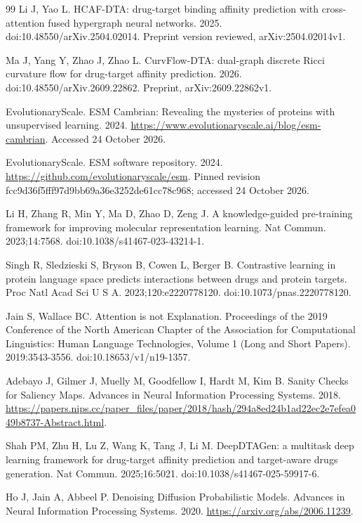 \documentclass[12pt,a4paper]{article}
\begin{document}
\begin{thebibliography}{99}
 Li J, Yao L. HCAF-DTA: drug-target binding affinity prediction with cross-attention fused hypergraph neural networks. 2025. doi:10.48550/arXiv.2504.02014. Preprint version reviewed, arXiv:2504.02014v1.

 Ma J, Yang Y, Zhao J, Zhao L. CurvFlow-DTA: dual-graph discrete Ricci curvature flow for drug-target affinity prediction. 2026. doi:10.48550/arXiv.2609.22862. Preprint, arXiv:2609.22862v1.

 EvolutionaryScale. ESM Cambrian: Revealing the mysteries of proteins with unsupervised learning. 2024. \url{https://www.evolutionaryscale.ai/blog/esm-cambrian}. Accessed 24 October 2026.

 EvolutionaryScale. ESM software repository. 2024. \url{https://github.com/evolutionaryscale/esm}. Pinned revision fcc9d36f5fff97d9bb69a36e3252de61cc78c968; accessed 24 October 2026.

 Li H, Zhang R, Min Y, Ma D, Zhao D, Zeng J. A knowledge-guided pre-training framework for improving molecular representation learning. Nat Commun. 2023;14:7568. doi:10.1038/s41467-023-43214-1.

 Singh R, Sledzieski S, Bryson B, Cowen L, Berger B. Contrastive learning in protein language space predicts interactions between drugs and protein targets. Proc Natl Acad Sci U S A. 2023;120:e2220778120. doi:10.1073/pnas.2220778120.

 Jain S, Wallace BC. Attention is not Explanation. Proceedings of the 2019 Conference of the North American Chapter of the Association for Computational Linguistics: Human Language Technologies, Volume 1 (Long and Short Papers). 2019:3543-3556. doi:10.18653/v1/n19-1357.

 Adebayo J, Gilmer J, Muelly M, Goodfellow I, Hardt M, Kim B. Sanity Checks for Saliency Maps. Advances in Neural Information Processing Systems. 2018. \url{https://papers.nips.cc/paper_files/paper/2018/hash/294a8ed24b1ad22ec2e7efea049b8737-Abstract.html}.

 Shah PM, Zhu H, Lu Z, Wang K, Tang J, Li M. DeepDTAGen: a multitask deep learning framework for drug-target affinity prediction and target-aware drugs generation. Nat Commun. 2025;16:5021. doi:10.1038/s41467-025-59917-6.

 Ho J, Jain A, Abbeel P. Denoising Diffusion Probabilistic Models. Advances in Neural Information Processing Systems. 2020. \url{https://arxiv.org/abs/2006.11239}.


\end{thebibliography}
\end{document}
